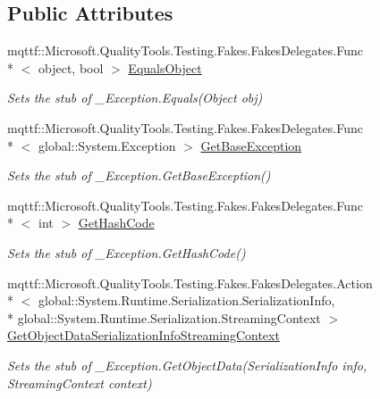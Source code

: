 \subsection*{Public Attributes}
\begin{DoxyCompactItemize}
\item 
mqttf\-::\-Microsoft.\-Quality\-Tools.\-Testing.\-Fakes.\-Fakes\-Delegates.\-Func\\*
$<$ object, bool $>$ \hyperlink{class_system_1_1_runtime_1_1_interop_services_1_1_fakes_1_1_stub___exception_a843cab085a21cd2f9d7f825eae4c94e5}{Equals\-Object}
\begin{DoxyCompactList}\small\item\em Sets the stub of \-\_\-\-Exception.\-Equals(\-Object obj)\end{DoxyCompactList}\item 
mqttf\-::\-Microsoft.\-Quality\-Tools.\-Testing.\-Fakes.\-Fakes\-Delegates.\-Func\\*
$<$ global\-::\-System.\-Exception $>$ \hyperlink{class_system_1_1_runtime_1_1_interop_services_1_1_fakes_1_1_stub___exception_af4ba5a18c093a2dde16a6e934ee1fb9b}{Get\-Base\-Exception}
\begin{DoxyCompactList}\small\item\em Sets the stub of \-\_\-\-Exception.\-Get\-Base\-Exception()\end{DoxyCompactList}\item 
mqttf\-::\-Microsoft.\-Quality\-Tools.\-Testing.\-Fakes.\-Fakes\-Delegates.\-Func\\*
$<$ int $>$ \hyperlink{class_system_1_1_runtime_1_1_interop_services_1_1_fakes_1_1_stub___exception_aa95aa7ce54605094054df2c97a8b8fd4}{Get\-Hash\-Code}
\begin{DoxyCompactList}\small\item\em Sets the stub of \-\_\-\-Exception.\-Get\-Hash\-Code()\end{DoxyCompactList}\item 
mqttf\-::\-Microsoft.\-Quality\-Tools.\-Testing.\-Fakes.\-Fakes\-Delegates.\-Action\\*
$<$ global\-::\-System.\-Runtime.\-Serialization.\-Serialization\-Info, \\*
global\-::\-System.\-Runtime.\-Serialization.\-Streaming\-Context $>$ \hyperlink{class_system_1_1_runtime_1_1_interop_services_1_1_fakes_1_1_stub___exception_a967efc45c4f5789d231d92027a9191c3}{Get\-Object\-Data\-Serialization\-Info\-Streaming\-Context}
\begin{DoxyCompactList}\small\item\em Sets the stub of \-\_\-\-Exception.\-Get\-Object\-Data(\-Serialization\-Info info, Streaming\-Context context)\end{DoxyCompactList}\item 

\end{DoxyCompactItemize}
